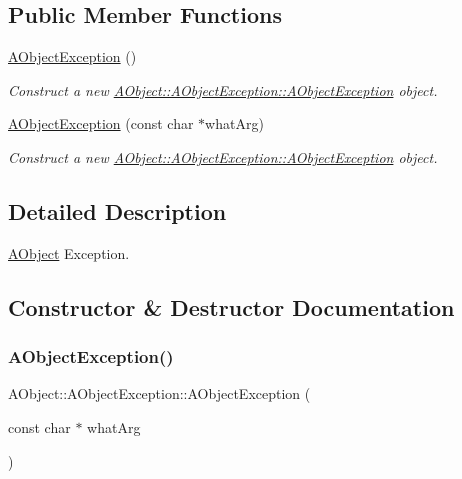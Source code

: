 \subsection*{Public Member Functions}
\begin{DoxyCompactItemize}
\item 
\mbox{\label{class_a_object_1_1_a_object_exception_a92efc57e8b4aa4e9283b3bf124924908}} 
\hyperlink{class_a_object_1_1_a_object_exception_a92efc57e8b4aa4e9283b3bf124924908}{A\+Object\+Exception} ()
\begin{DoxyCompactList}\small\item\em Construct a new \hyperlink{class_a_object_1_1_a_object_exception_a92efc57e8b4aa4e9283b3bf124924908}{A\+Object\+::\+A\+Object\+Exception\+::\+A\+Object\+Exception} object. \end{DoxyCompactList}\item 
\hyperlink{class_a_object_1_1_a_object_exception_a2c7e9151effc8e9b85500714fb1b87d6}{A\+Object\+Exception} (const char $\ast$what\+Arg)
\begin{DoxyCompactList}\small\item\em Construct a new \hyperlink{class_a_object_1_1_a_object_exception_a92efc57e8b4aa4e9283b3bf124924908}{A\+Object\+::\+A\+Object\+Exception\+::\+A\+Object\+Exception} object. \end{DoxyCompactList}\end{DoxyCompactItemize}


\subsection{Detailed Description}
\hyperlink{class_a_object}{A\+Object} Exception. 

\subsection{Constructor \& Destructor Documentation}
\mbox{\label{class_a_object_1_1_a_object_exception_a2c7e9151effc8e9b85500714fb1b87d6}} 
\subsubsection{\texorpdfstring{A\+Object\+Exception()}{AObjectException()}}
{\footnotesize\ttfamily A\+Object\+::\+A\+Object\+Exception\+::\+A\+Object\+Exception (\begin{DoxyParamCaption}\item[{const char $\ast$}]{what\+Arg }\end{DoxyParamCaption})\hspace{0.3cm}{\ttfamily [explicit]}}



